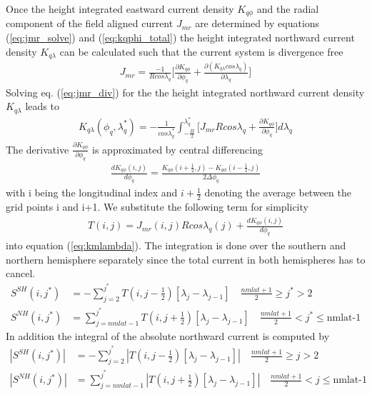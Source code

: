 %
Once the height integrated eastward current density $K_{q \phi}$ and the radial
component of the field aligned current $J_{mr}$ are determined by equations 
(\ref{eq:jmr_solve}) and (\ref{eq:kqphi_total}) the height integrated northward
current density $K_{q \lambda}$ can be calculated such that the current system is
divergence free
%
\begin{align}
  J_{mr} = \frac{-1}{R cos \lambda_q} \bigl[ 
    \frac{\partial K_{q \phi}}{\partial \phi_q} + 
    \frac{\partial (K_{q \lambda} cos \lambda_q)}{\partial \lambda_q}  
    \bigr]\label{eq:jmr_div}
\end{align}
% 
Solving eq. (\ref{eq:jmr_div}) for the the height integrated northward 
current density $K_{q \lambda}$ leads to
%
\begin{align}
  K_{q \lambda} (\phi_q,\lambda_q^*)= - \frac{1}{cos \lambda_q^*} \int_{-\frac{\Pi}{2}}^{\lambda_q^*}
   \bigl[ J_{mr} R cos \lambda_q + \frac{\partial K_{q \phi}}{\partial \phi_q} 
   \bigr] d \lambda_q\label{eq:kmlambda}
\end{align}
% 
The derivative $\frac{\partial K_{q \phi}}{\partial \phi_q}$ is approximated by
central differencing
%
\begin{align}
   \frac{d K_{q \phi}(i,j)}{d \phi_q} = \frac{K_{q \phi}(i + \frac{1}{2},j) - 
   K_{q \phi}(i - \frac{1}{2},j)}{2 \Delta \phi_q} 
   \label{eq:deriv_kqphi}
\end{align}
%
with i being the longitudinal index and $i + \frac{1}{2}$ denoting the average
between the grid points i and i+1. We substitute the following term for
simplicity 
%
\begin{align}
   T(i,j) =  J_{mr}(i,j) R cos \lambda_q(j) + \frac{d K_{q \phi}(i,j)}{d \phi_q}
   \label{eq:kqlam_simpl}
\end{align}
%
into equation (\ref{eq:kmlambda}). The integration is done over the
southern and northern hemisphere separately since the total current in
both hemispheres has to cancel. 
%
\begin{align}
   S^{SH}(i,j^*) &= - \sum_{j=2}^{j^*} T(i,j-\frac{1}{2})[\lambda_j - \lambda_{j-1}]
    \quad \frac{nmlat+1}{2} \ge j^* > 2 \label{eq:kqlam_sum sh} \\
   S^{NH}(i,j^*) &=  \sum_{j=nmlat-1}^{j^*} T(i,j+\frac{1}{2})[\lambda_j - \lambda_{j-1}]
    \quad \frac{nmlat+1}{2} < j^* \le \text{nmlat-1} \label{eq:kqlam_sum_nh}
\end{align}
%
In addition the integral of the absolute northward current is computed by
%
\begin{align}
   | S^{SH}(i,j^*)| &= - \sum_{j=2}^{j^*} | T(i,j-\frac{1}{2})[\lambda_j -
      \lambda_{j-1}]|
    \quad  \frac{nmlat+1}{2}\ge j > 2 \label{eq:kqlam_abssum sh} \\
   | S^{NH}(i,j^*)| &=  \sum_{j=nmlat-1}^{j^*} | T(i,j+\frac{1}{2})[\lambda_j -
      \lambda_{j-1}] |
    \quad \frac{nmlat+1}{2} < j \le \text{nmlat-1} \label{eq:kqlam_abssum_nh}
\end{align}
